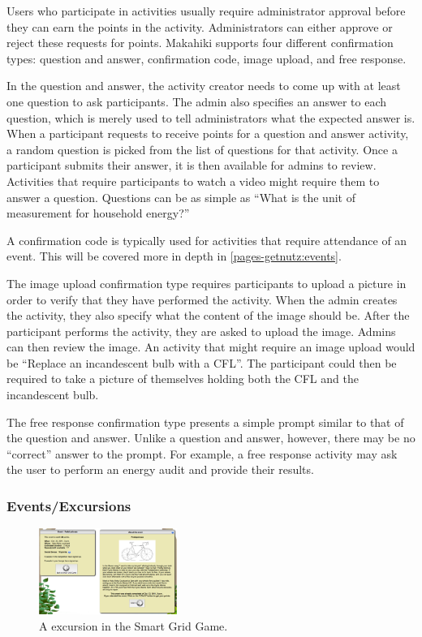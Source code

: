 Users who participate in activities usually require administrator approval before they can earn the points in the activity.  Administrators can either approve or reject these requests for points.  Makahiki supports four different confirmation types: question and answer, confirmation code, image upload, and free response.

In the question and answer, the activity creator needs to come up with at least one question to ask participants.  The admin also specifies an answer to each question, which is merely used to tell administrators what the expected answer is.  When a participant requests to receive points for a question and answer activity, a random question is picked from the list of questions for that activity.  Once a participant submits their answer, it is then available for admins to review.  Activities that require participants to watch a video might require them to answer a question.  Questions can be as simple as ``What is the unit of measurement for household energy?''

A confirmation code is typically used for activities that require attendance of an event.  This will be covered more in depth in \autoref{pages-getnutz:events}.

The image upload confirmation type requires participants to upload a picture in order to verify that they have performed the activity.  When the admin creates the activity, they also specify what the content of the image should be.  After the participant performs the activity, they are asked to upload the image.  Admins can then review the image.  An activity that might require an image upload would be ``Replace an incandescent bulb with a CFL''.  The participant could then be required to take a picture of themselves holding both the CFL and the incandescent bulb.

The free response confirmation type presents a simple prompt similar to that of the question and answer.  Unlike a question and answer, however, there may be no ``correct'' answer to the prompt.  For example, a free response activity  may ask the user to perform an energy audit and provide their results.

\subsubsection{Events/Excursions}
\label{pages-getnutz:events}

\begin{figure}[h]
  \center
  \includegraphics[width=0.4\textwidth]{images/event-excursion.eps}
  \caption{A excursion in the Smart Grid Game.}
  \label{fig:excursion-sgg}
\end{figure}

